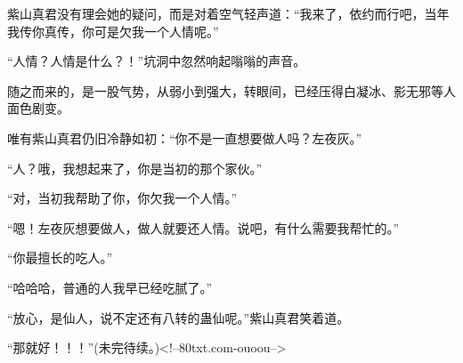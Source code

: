 \begin{this_body}
紫山真君没有理会她的疑问，而是对着空气轻声道：“我来了，依约而行吧，当年我传你真传，你可是欠我一个人情呢。”

“人情？人情是什么？！”坑洞中忽然响起嗡嗡的声音。

随之而来的，是一股气势，从弱小到强大，转眼间，已经压得白凝冰、影无邪等人面色剧变。

唯有紫山真君仍旧冷静如初：“你不是一直想要做人吗？左夜灰。”

“人？哦，我想起来了，你是当初的那个家伙。”

“对，当初我帮助了你，你欠我一个人情。”

“嗯！左夜灰想要做人，做人就要还人情。说吧，有什么需要我帮忙的。”

“你最擅长的吃人。”

“哈哈哈，普通的人我早已经吃腻了。”

“放心，是仙人，说不定还有八转的蛊仙呢。”紫山真君笑着道。

“那就好！！！”(未完待续。)<!--80txt.com-ouoou-->

\end{this_body}

